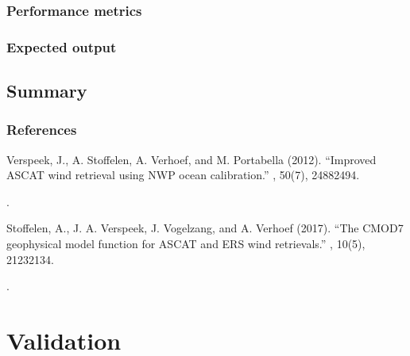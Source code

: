 \documentclass[a4paper,10pt,english]{sphinxmanual}
\begin{document}
\subsubsection{Performance metrics}
\label{\detokenize{alg-01-calibration:id9}}

\subsubsection{Expected output}
\label{\detokenize{alg-01-calibration:id10}}

\subsection{Summary}
\label{\detokenize{alg-01-calibration:summary}}\subsubsection*{References}
\label{\detokenize{alg-01-calibration:ref-verspeek-noc}}
\sphinxAtStartPar
Verspeek, J., A. Stoffelen, A. Verhoef, and M. Portabella (2012). “Improved
ASCAT wind retrieval using NWP ocean calibration.” , 50(7), 2488\textendash{}2494.
%
\begin{footnote}[4]\sphinxAtStartFootnote
{}
%
\end{footnote}.

\label{\detokenize{alg-01-calibration:ref-stoffelen-cmod7}}
\sphinxAtStartPar
Stoffelen, A., J. A. Verspeek, J. Vogelzang, and A. Verhoef (2017). “The CMOD7
geophysical model function for ASCAT and ERS wind retrievals.” , 10(5),
2123\textendash{}2134.
%
\begin{footnote}[5]\sphinxAtStartFootnote
{}
%
\end{footnote}.

\sphinxstepscope


\section{Validation}
\label{\detokenize{alg-02-validation:validation}}\label{\detokenize{alg-02-validation::doc}}
\end{document}
